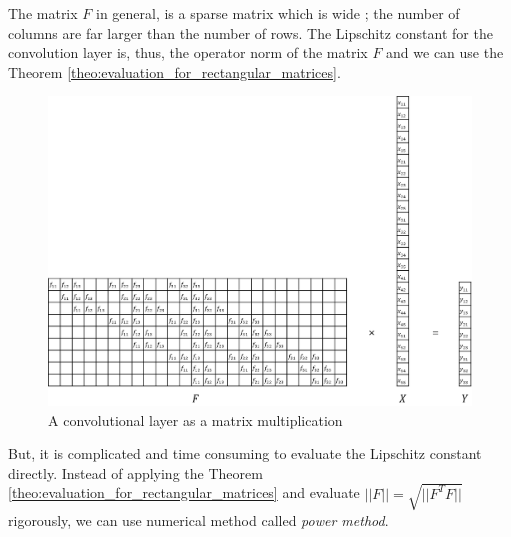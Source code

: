 \documentclass[12pt]{report}
\numberwithin{figure}{chapter}
\theoremstyle{plain}
\theoremstyle{definition}
\theoremstyle{corollary}
\theoremstyle{definition}
\theoremstyle{plain}
\theoremstyle{definition}
\theoremstyle{plain}
\begin{document}
The matrix \(F\) in general, is a sparse matrix which is wide ; the number of columns are far larger than the number of rows.
The Lipschitz constant for the convolution layer is, thus, the operator norm of the matrix \(F\) and we can use the Theorem \ref{theo:evaluation_for_rectangular_matrices}.


\begin{figure}[h]
\centering
\includegraphics[width=\textwidth]{convolution_matrix}
\caption{A convolutional layer as a matrix multiplication}
\label{convolution_matrix}
\end{figure}

But, it is complicated and time consuming to evaluate the Lipschitz constant directly.
Instead of applying the Theorem \ref{theo:evaluation_for_rectangular_matrices} and evaluate \(||F||=\sqrt{||F^TF||}\) rigorously, we can use numerical method called \emph{power method}.
\end{document}
